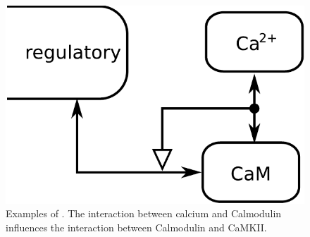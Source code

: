 \begin{figure}[H]
  \centering
  \includegraphics[scale = 0.5]{examples/ex-interaction}
  \caption{Examples of . The interaction between calcium and Calmodulin influences the interaction between Calmodulin and CaMKII.}
  \label{fig:ex-interaction}
\end{figure}



\normalcolor